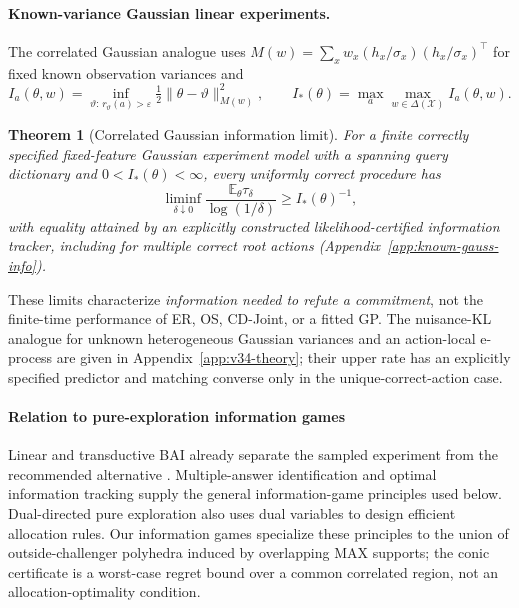 \documentclass{article}
\theoremstyle{plain}
\newtheorem{theorem}{Theorem}[section]
\theoremstyle{definition}
\begin{document}
\paragraph{Known-variance Gaussian linear experiments.} The correlated Gaussian analogue uses $M(w)=\sum_x w_x(h_x/\sigma_x)(h_x/\sigma_x)^\top$ for fixed known observation variances and
\begin{equation}
 I_a(\theta,w)=\inf_{\vartheta:\,r_\vartheta(a)>\varepsilon}\tfrac12\|\theta-\vartheta\|_{M(w)}^2,\qquad
 I_*(\theta)=\max_a\max_{w\in\Delta(\mathcal X)}I_a(\theta,w).
 \label{eq:bay-main-information}
\end{equation}
\begin{theorem}[Correlated Gaussian information limit]\label{thm:bay-main-optimal}
For a finite correctly specified fixed-feature Gaussian experiment model with a spanning query dictionary and $0<I_*(\theta)<\infty$, every uniformly correct procedure has
\begin{equation}
 \liminf_{\delta\downarrow0}\frac{\mathbb E_\theta\tau_\delta}{\log(1/\delta)}\ge I_*(\theta)^{-1},
 \label{eq:bay-main-optimal}
\end{equation}
with equality attained by an explicitly constructed likelihood-certified information tracker, including for multiple correct root actions (Appendix~\ref{app:known-gauss-info}).
\end{theorem}
These limits characterize \emph{information needed to refute a commitment}, not the finite-time performance of ER, OS, CD-Joint, or a fitted GP. The nuisance-KL analogue for unknown heterogeneous Gaussian variances and an action-local e-process are given in Appendix~\ref{app:v34-theory}; their upper rate has an explicitly specified predictor and matching converse only in the unique-correct-action case.

\paragraph{Relation to pure-exploration information games}

Linear and transductive BAI already separate the sampled experiment from the recommended alternative \citep{soare2014linear,xu2018lingape,fiez2019,degenne2020gamification,jedra2020linear}. Multiple-answer identification and optimal information tracking \citep{degenne2019multiple,jourdan2022answers,garivier2016optimal} supply the general information-game principles used below. Dual-directed pure exploration \citep{qin2026dual} also uses dual variables to design efficient allocation rules. Our information games specialize these principles to the union of outside-challenger polyhedra induced by overlapping MAX supports; the conic certificate is a worst-case regret bound over a common correlated region, not an allocation-optimality condition.
\end{document}
